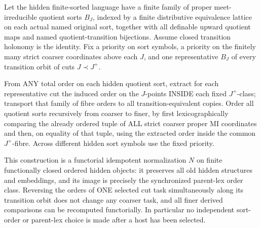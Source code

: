 \begin{lemma}
\label{lem:foundational-hierarchical-order-normalization}
Let the hidden finite-sorted language have a finite
family of proper meet-irreducible quotient sorts
\(B_J\), indexed by a finite distributive
equivalence lattice on each actual named original
sort, together with all definable upward quotient
maps and named quotient-transition bijections.
Assume closed transition holonomy is the identity.
Fix a priority on sort symbols, a priority on
the finitely many strict coarser coordinates
above each \(J\), and one representative
\(B_J\) of every transition orbit of cuts
\(J\prec J^+\).

From ANY total order on each hidden quotient sort,
extract for each representative cut the induced
order on the \(J\)-points INSIDE each fixed
\(J^+\)-class; transport that family of fibre
orders to all transition-equivalent copies.
Order all quotient sorts recursively from coarser
to finer, by first lexicographically comparing
the already ordered tuple of ALL strict coarser
proper MI coordinates and then, on equality
of that tuple, using the extracted order inside
the common \(J^+\)-fibre. Across different
hidden sort symbols use the fixed priority.

This construction is a functorial idempotent
normalization \(N\) on finite functionally
closed ordered hidden objects: it preserves
all old hidden structures and embeddings,
and its image is precisely the synchronized
parent-lex order class. Reversing the orders
of ONE selected cut task simultaneously along
its transition orbit does not change any
coarser task, and all finer derived comparisons
can be recomputed functorially. In particular
no independent sort-order or parent-lex choice
is made after a host has been selected.
\end{lemma}
